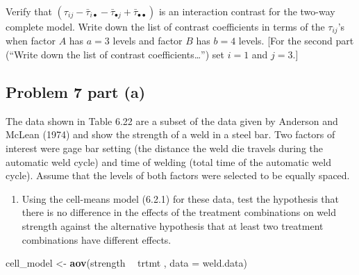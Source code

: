 \documentclass[12pt,]{article}
\newenvironment{Shaded}{\begin{snugshade}}{\end{snugshade}}
\newcommand{\KeywordTok}[1]{\textcolor[rgb]{0.13,0.29,0.53}{\textbf{#1}}}
\newcommand{\DataTypeTok}[1]{\textcolor[rgb]{0.13,0.29,0.53}{#1}}
\newcommand{\StringTok}[1]{\textcolor[rgb]{0.31,0.60,0.02}{#1}}
\newcommand{\OtherTok}[1]{\textcolor[rgb]{0.56,0.35,0.01}{#1}}
\newcommand{\OperatorTok}[1]{\textcolor[rgb]{0.81,0.36,0.00}{\textbf{#1}}}
\newcommand{\NormalTok}[1]{#1}
\providecommand{\tightlist}{%
  \setlength{\itemsep}{0pt}\setlength{\parskip}{0pt}}
\begin{document}
Verify that
\((\tau_{ij} - \bar{\tau}_{i\bullet} - \bar{\tau}_{\bullet j} + \bar{\tau}_{\bullet \bullet})\)
is an interaction contrast for the two-way complete model. Write down
the list of contrast coefficients in terms of the \(\tau_{ij}\)'s when
factor \(A\) has \(a = 3\) levels and factor \(B\) has \(b=4\) levels.
{[}For the second part (``Write down the list of contrast
coefficients\ldots{}'') set \(i=1\) and \(j = 3\).{]}

\subsection{Problem 7 part (a)}\label{problem-7-part-a}

The data shown in Table 6.22 are a subset of the data given by Anderson
and McLean (1974) and show the strength of a weld in a steel bar. Two
factors of interest were gage bar setting (the distance the weld die
travels during the automatic weld cycle) and time of welding (total time
of the automatic weld cycle). Assume that the levels of both factors
were selected to be equally spaced.

\begin{Shaded}
\end{Shaded}

\begin{enumerate}
\def\labelenumi{(\alph{enumi})}
\tightlist
\item
  Using the cell-means model (6.2.1) for these data, test the hypothesis
  that there is no difference in the effects of the treatment
  combinations on weld strength against the alternative hypothesis that
  at least two treatment combinations have different effects.
\end{enumerate}

\begin{Shaded}
\begin{Highlighting}[]
\NormalTok{cell_model <-}\StringTok{ }\KeywordTok{aov}\NormalTok{(strength }\OperatorTok{~}\StringTok{ }\NormalTok{trtmt , }\DataTypeTok{data =}\NormalTok{ weld.data)}
\end{Highlighting}
\end{Shaded}
\end{document}
